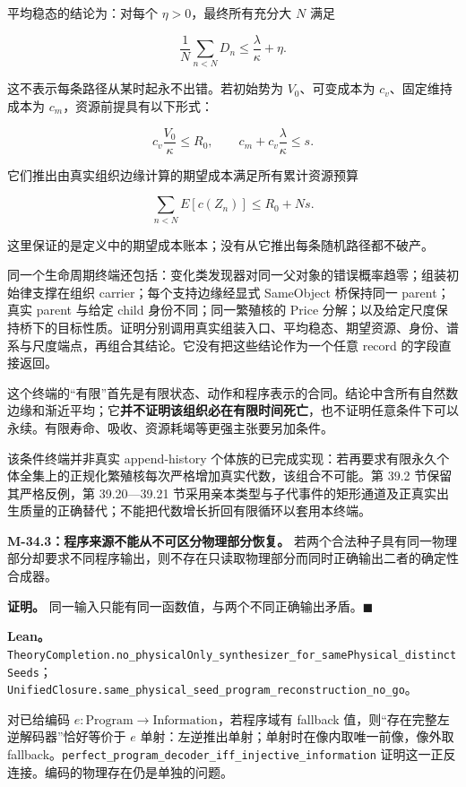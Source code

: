 \documentclass[
  11pt,
  oneside]{book}
\begin{document}
平均稳态的结论为：对每个 \(\eta>0\)，最终所有充分大 \(N\) 满足

\[\frac1N\sum_{n<N}D_n\le\frac\lambda\kappa+\eta.\]

这不表示每条路径从某时起永不出错。若初始势为 \(V_0\)、可变成本为 \(c_v\)、固定维持成本为 \(c_m\)，资源前提具有以下形式：

\[c_v\frac{V_0}{\kappa}\le R_0,\qquad
c_m+c_v\frac\lambda\kappa\le s.\]

它们推出由真实组织边缘计算的期望成本满足所有累计资源预算

\[\sum_{n<N}E[c(Z_n)]\le R_0+Ns.\]

这里保证的是定义中的期望成本账本；没有从它推出每条随机路径都不破产。

同一个生命周期终端还包括：变化类发现器对同一父对象的错误概率趋零；组装初始律支撑在组织 carrier；每个支持边缘经显式 SameObject 桥保持同一 parent；真实 parent 与给定 child 身份不同；同一繁殖核的 Price 分解；以及给定尺度保持桥下的目标性质。证明分别调用真实组装入口、平均稳态、期望资源、身份、谱系与尺度端点，再组合其结论。它没有把这些结论作为一个任意 record 的字段直接返回。

这个终端的``有限''首先是有限状态、动作和程序表示的合同。结论中含所有自然数边缘和渐近平均；它\textbf{并不证明该组织必在有限时间死亡}，也不证明任意条件下可以永续。有限寿命、吸收、资源耗竭等更强主张要另加条件。

该条件终端并非真实 append-history 个体族的已完成实现：若再要求有限永久个体全集上的正规化繁殖核每次严格增加真实代数，该组合不可能。第 39.2 节保留其严格反例，第 39.20---39.21 节采用亲本类型与子代事件的矩形通道及正真实出生质量的正确替代；不能把代数增长折回有限循环以套用本终端。

\hypertarget{m-34-3}{}\label{m-34-3}

\textbf{M-34.3：程序来源不能从不可区分物理部分恢复。} 若两个合法种子具有同一物理部分却要求不同程序输出，则不存在只读取物理部分而同时正确输出二者的确定性合成器。

\textbf{证明。} 同一输入只能有同一函数值，与两个不同正确输出矛盾。\(\blacksquare\)

\textbf{Lean。} \nolinkurl{TheoryCompletion.no_physicalOnly_synthesizer_for_samePhysical_distinctSeeds}；\nolinkurl{UnifiedClosure.same_physical_seed_program_reconstruction_no_go}。

对已给编码 \(e:\mathrm{Program}\to\mathrm{Information}\)，若程序域有 fallback 值，则``存在完整左逆解码器''恰好等价于 \(e\) 单射：左逆推出单射；单射时在像内取唯一前像，像外取 fallback。\nolinkurl{perfect_program_decoder_iff_injective_information} 证明这一正反连接。编码的物理存在仍是单独的问题。
\end{document}
